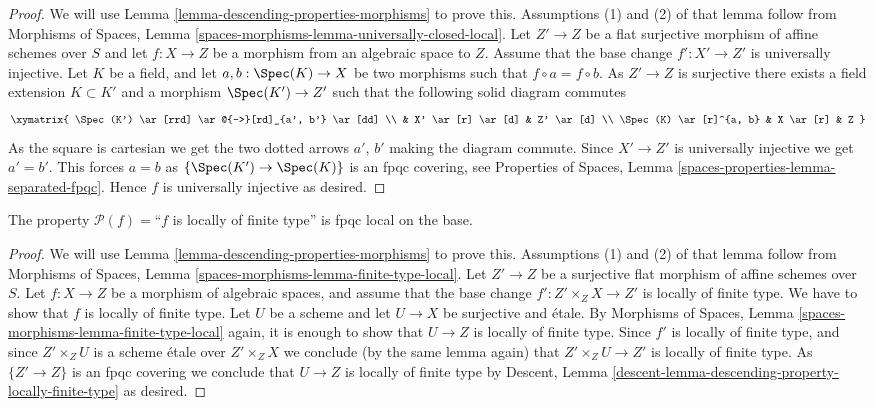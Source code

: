 \begin{proof}
We will use
Lemma \ref{lemma-descending-properties-morphisms}
to prove this. Assumptions (1) and (2) of that lemma follow from
Morphisms of Spaces,
Lemma \ref{spaces-morphisms-lemma-universally-closed-local}.
Let $Z' \to Z$ be a flat surjective morphism of affine schemes
over $S$ and let $f : X \to Z$ be a morphism from an algebraic space to $Z$.
Assume that the base change $f' : X' \to Z'$ is universally injective.
Let $K$ be a field, and let $a, b : \Spec(K) \to X$
be two morphisms such that $f \circ a = f \circ b$.
As $Z' \to Z$ is surjective there exists a field
extension $K \subset K'$ and a morphism
$\Spec(K') \to Z'$
such that the following solid diagram commutes
$$
\xymatrix{
\Spec(K') \ar[rrd] \ar@{-->}[rd]_{a', b'} \ar[dd] \\
 &
X' \ar[r] \ar[d] &
Z' \ar[d] \\
\Spec(K) \ar[r]^{a, b} &
X \ar[r] &
Z
}
$$
As the square is cartesian we get the two dotted arrows $a'$, $b'$ making the
diagram commute. Since $X' \to Z'$ is universally injective we get $a' = b'$.
This forces $a = b$ as $\{\Spec(K') \to \Spec(K)\}$
is an fpqc covering, see
Properties of Spaces, Lemma \ref{spaces-properties-lemma-separated-fpqc}.
Hence $f$ is universally injective as desired.
\end{proof}

\begin{lemma}
\label{lemma-descending-property-locally-finite-type}
The property $\mathcal{P}(f) =$``$f$ is locally of finite type''
is fpqc local on the base.
\end{lemma}

\begin{proof}
We will use
Lemma \ref{lemma-descending-properties-morphisms}
to prove this. Assumptions (1) and (2) of that lemma follow from
Morphisms of Spaces,
Lemma \ref{spaces-morphisms-lemma-finite-type-local}.
Let $Z' \to Z$ be a surjective flat morphism of affine schemes over $S$.
Let $f : X \to Z$ be a morphism of algebraic spaces, and assume
that the base change $f' : Z' \times_Z X \to Z'$ is locally of finite type.
We have to show that $f$ is locally of finite type. Let $U$ be a scheme
and let $U \to X$ be surjective and \'etale. By
Morphisms of Spaces,
Lemma \ref{spaces-morphisms-lemma-finite-type-local}
again, it is enough to show that $U \to Z$ is locally of finite type.
Since $f'$ is locally of finite type, and since $Z' \times_Z U$ is a
scheme \'etale over $Z' \times_Z X$ we conclude (by the same lemma again) that
$Z' \times_Z U \to Z'$ is locally of finite type.
As $\{Z' \to Z\}$ is an fpqc covering we conclude that
$U \to Z$ is locally of finite type by
Descent, Lemma \ref{descent-lemma-descending-property-locally-finite-type}
as desired.
\end{proof}

